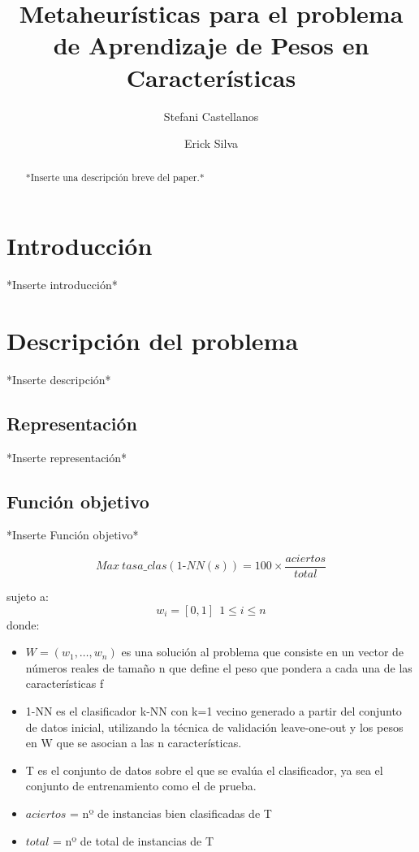 \documentclass{ci5652}
\title{Metaheurísticas para el problema de Aprendizaje de Pesos en Características}
\author{Stefani Castellanos
        \and
        Erick Silva}
\begin{document}
\maketitle

\begin{abstract}
*Inserte una descripción breve del paper.*
\end{abstract}

\section*{Introducción}
*Inserte introducción*


\section{Descripción del problema}
*Inserte descripción*

\subsection{Representación}
*Inserte representación*

\subsection{Función objetivo}
*Inserte Función objetivo*

\begin{equation}
    Max\ tasa\_clas(1\textit{-}NN(s)) = 100 \times \frac{aciertos}{total}
\end{equation}

sujeto a:
\[
w_i = [0, 1] \ \ 1 \leq i \leq n
\]
donde:
\begin{itemize}
  \item $W = (w_1, …, w_n)$ es una solución al problema que consiste en un vector de
  números reales de tamaño n que define el peso que pondera a cada una de las
  características f
  \item 1-NN es el clasificador k-NN con k=1 vecino generado a partir del conjunto de
  datos inicial, utilizando la técnica de validación leave-one-out y los pesos en W
  que se asocian a las n características.
  \item T es el conjunto de datos sobre el que se evalúa el clasificador, ya sea el
  conjunto de entrenamiento como el de prueba.
  \item $aciertos$ = nº de instancias bien clasificadas de T
  \item $total$ =  nº de total de instancias de T
\end{itemize}
\end{document}
